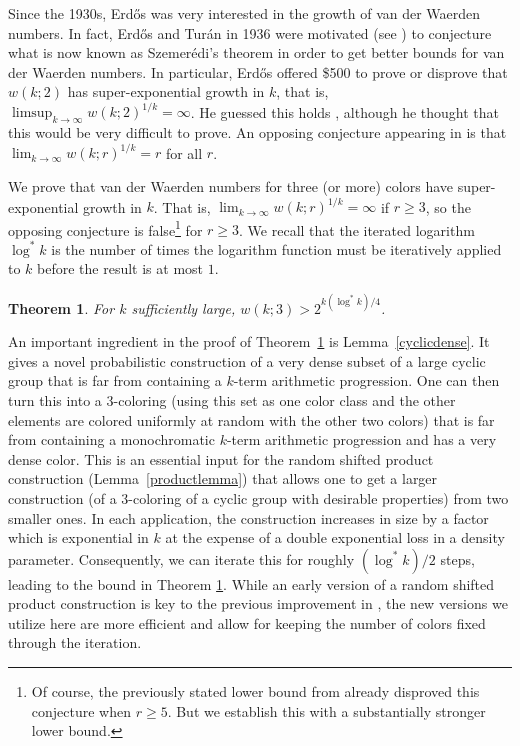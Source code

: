 \documentclass[11pt]{article}
\numberwithin{equation}{section}
\newtheorem{thm}{Theorem}
\theoremstyle{definition}
\theoremstyle{remark}
\begin{document}
Since the 1930s, Erd\H{o}s was very interested in the growth of van der Waerden numbers. In fact, Erd\H{o}s and Tur\'an \cite{ErTu} in 1936 were motivated (see \cite{erdos1975}) to conjecture what is now known as Szemer\'edi's theorem in order to get better bounds for van der Waerden numbers. In particular, Erd\H{o}s \cite{Erdos1980,Erdos1981,Erdos1981b} offered \$500  to prove or disprove that $w(k;2)$ has super-exponential growth in $k$, that is, $\limsup_{k \to \infty} w(k;2)^{1/k} = \infty$. He guessed this holds \cite{erdos1975}, although he thought that this would be very difficult to prove. An opposing conjecture appearing in \cite{GRS,Monroe,XLL} is that $\lim_{k \to \infty} w(k;r)^{1/k}= r$ for all $r$.

We prove that van der Waerden numbers for three (or more) colors have super-exponential growth in $k$. That is, $\lim_{k \to \infty} w(k;r)^{1/k}= \infty$ if $r \geq 3$, so the opposing conjecture is false\footnote{Of course, the previously stated lower bound from \cite{Hunter} already disproved this conjecture when $r\ge 5$. But we establish this with a substantially stronger lower bound.} for $r \geq 3$.  We recall that the iterated logarithm $\log^* k$ is the number of times the logarithm function must be iteratively applied to $k$ before the result is at most $1$.

\begin{thm}\label{super-exponential}
For $k$ sufficiently large, $w(k;3) > 2^{k(\log^* k)/4}$.     
\end{thm}
 
An important ingredient in the proof of Theorem~\ref{super-exponential} is Lemma~\ref{cyclicdense}. It gives a novel probabilistic construction of a very dense subset of a large cyclic group that is far from containing a $k$-term arithmetic progression. One can then turn this into a $3$-coloring (using this set as one color class and the other elements are colored uniformly at random with the other two colors) that is far from containing a monochromatic $k$-term arithmetic progression and has a very dense color. This is an essential input for the random shifted product construction (Lemma~\ref{productlemma}) that allows one to get a larger construction (of a $3$-coloring of a cyclic group with desirable properties) from two smaller ones. In each application, the construction increases in size by a factor which is exponential in $k$ at the expense of a double exponential loss in a density parameter. Consequently, we can iterate this for roughly $(\log^* k)/2$ steps, leading to the bound in Theorem \ref{super-exponential}. While an early version of a random shifted product construction is key to the previous improvement in \cite{Hunter}, the new versions we utilize here are more efficient and allow for keeping the number of colors fixed through the iteration. 
\end{document}

